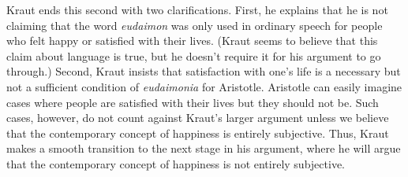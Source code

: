 \documentclass[12pt,letterpaper]{article}
\begin{document}
Kraut ends this second with two clarifications.
First, he explains that he is not claiming that the word \textit{eudaimon} was only used in ordinary speech for people who felt happy or satisfied with their lives.
(Kraut seems to believe that this claim about language is true, but he doesn't require it for his argument to go through.)
Second, Kraut insists that satisfaction with one's life is a necessary but not a sufficient condition of \textit{eudaimonia} for Aristotle.
Aristotle can easily imagine cases where people are satisfied with their lives but they should not be.
Such cases, however, do not count against Kraut's larger argument unless we believe that the contemporary concept of happiness is entirely subjective.
Thus, Kraut makes a smooth transition to the next stage in his argument, where he will argue that the contemporary concept of happiness is not entirely subjective.

\newpage\
\pagestyle{references}
\printbibliography[title={Bibliography}]
\end{document}
